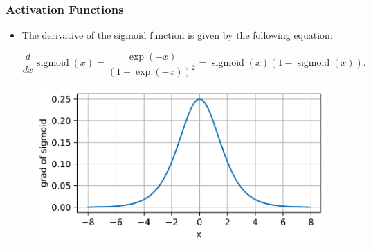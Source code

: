 \documentclass[
  shownotes,
  xcolor={svgnames},
  hyperref={colorlinks,citecolor=DarkBlue,linkcolor=DarkRed,urlcolor=DarkBlue}
  , aspectratio=169]{beamer}
\begin{document}
\begin{frame}
\frametitle{Activation Functions}

\begin{itemize}
\item The derivative of the sigmoid function is given by the following equation:

$$\frac{d}{dx} \operatorname{sigmoid}(x) = \frac{\exp(-x)}{(1 + \exp(-x))^2} = \operatorname{sigmoid}(x)\left(1-\operatorname{sigmoid}(x)\right).$$

\end{itemize}




  \begin{figure}[H] \centering
            \captionsetup{justification=centering}
              \includegraphics[scale=0.45]{figures/sigmoid_dev}
              
 \end{figure}

\end{frame}
\end{document}
